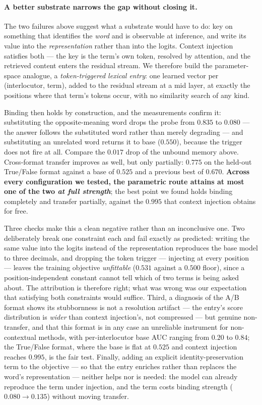 \documentclass[11pt]{article}
\begin{document}
\paragraph{A better substrate narrows the gap without closing it.}
The two failures above suggest what a substrate would have to do: key on something that
identifies the \emph{word} and is observable at inference, and write its value into the
\emph{representation} rather than into the logits. Context injection satisfies both --- the
key is the term's own token, resolved by attention, and the retrieved content enters the
residual stream. We therefore build the parameter-space analogue, a \emph{token-triggered
lexical entry}: one learned vector per (interlocutor, term), added to the residual stream at
a mid layer, at exactly the positions where that term's tokens occur, with no similarity
search of any kind.

Binding then holds by construction, and the measurements confirm it: substituting the
opposite-meaning word drops the probe from $0.835$ to $\mathbf{0.080}$ --- the answer follows
the substituted word rather than merely degrading --- and substituting an unrelated word
returns it to base ($0.550$), because the trigger does not fire at all. Compare the
$0.017$ drop of the unbound memory above. Cross-format transfer improves as well, but only
partially: $0.775$ on the held-out True/False format against a base of $0.525$ and a
previous best of $0.670$. \textbf{Across every configuration we tested, the parametric route
attains at most one of the two \emph{at full strength}}; the best point we found holds
binding completely and transfer partially, against the $0.995$ that context injection obtains
for free.

Three checks make this a clean negative rather than an inconclusive one. Two deliberately
break one constraint each and fail exactly as predicted: writing the same value into the
logits instead of the representation reproduces the base model to three decimals, and
dropping the token trigger --- injecting at every position --- leaves the training objective
\emph{unfittable} ($0.531$ against a $0.500$ floor), since a position-independent constant
cannot tell which of two terms is being asked about. The attribution is therefore right; what
was wrong was our expectation that satisfying both constraints would suffice. Third, a
diagnosis of the A/B format shows its stubbornness is not a resolution artifact --- the
entry's score distribution is \emph{wider} than context injection's, not compressed --- but
genuine non-transfer, and that this format is in any case an unreliable instrument for
non-contextual methods, with per-interlocutor base AUC ranging from $0.20$ to $0.84$; the
True/False format, where the base is flat at $0.525$ and context injection reaches $0.995$,
is the fair test. Finally, adding an explicit identity-preservation term to the objective ---
so that the entry enriches rather than replaces the word's representation --- neither helps
nor is needed: the model can already reproduce the term under injection, and the term costs
binding strength ($0.080 \to 0.135$) without moving transfer.
\end{document}
